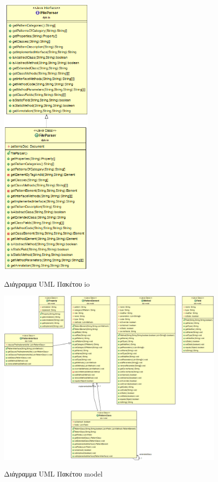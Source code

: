 \begin{figure}[H]
    \centering
    \includegraphics[width=0.4\textwidth]{Figures/io.png}
    \label{fig:ioUML}
    \caption{Διάγραμμα UML Πακέτου io}
\end{figure}
\begin{figure}[H]
    \centering
    \includegraphics[width=1.0\textwidth]{Figures/model.png}
    \label{fig:modelUML}
    \caption{Διάγραμμα UML Πακέτου model}
\end{figure}
\label{subsec:ClassUML}
